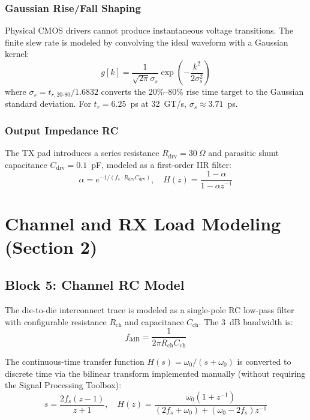 \documentclass[conference]{IEEEtran}
\begin{document}
\subsubsection{Gaussian Rise/Fall Shaping}
Physical CMOS drivers cannot produce instantaneous voltage transitions. The finite slew rate is modeled by convolving the ideal waveform with a Gaussian kernel:
\begin{equation}
    g[k] = \frac{1}{\sqrt{2\pi}\sigma_s} \exp\!\left(-\frac{k^2}{2\sigma_s^2}\right)
\end{equation}
where $\sigma_s = t_{r,20\text{-}80} / 1.6832$ converts the 20\%--80\% rise time target to the Gaussian standard deviation. For $t_r = 6.25$~ps at 32~GT/s, $\sigma_s \approx 3.71$~ps.

\subsubsection{Output Impedance RC}
The TX pad introduces a series resistance $R_{\text{drv}} = 30~\Omega$ and parasitic shunt capacitance $C_{\text{drv}} = 0.1$~pF, modeled as a first-order IIR filter:
\begin{equation}
    \alpha = e^{-1/(f_s \cdot R_{\text{drv}} C_{\text{drv}})}, \quad H(z) = \frac{1-\alpha}{1 - \alpha z^{-1}}
\end{equation}

\section{Channel and RX Load Modeling (Section 2)}

\subsection{Block 5: Channel RC Model}

The die-to-die interconnect trace is modeled as a single-pole RC low-pass filter with configurable resistance $R_{\text{ch}}$ and capacitance $C_{\text{ch}}$. The 3~dB bandwidth is:
\begin{equation}
    f_{3\text{dB}} = \frac{1}{2\pi R_{\text{ch}} C_{\text{ch}}}
\end{equation}

The continuous-time transfer function $H(s) = \omega_0 / (s + \omega_0)$ is converted to discrete time via the bilinear transform implemented manually (without requiring the Signal Processing Toolbox):
\begin{equation}
    s = \frac{2f_s (z-1)}{z+1}, \quad H(z) = \frac{\omega_0(1 + z^{-1})}{(2f_s + \omega_0) + ({\omega_0 - 2f_s})z^{-1}}
\end{equation}
\end{document}
